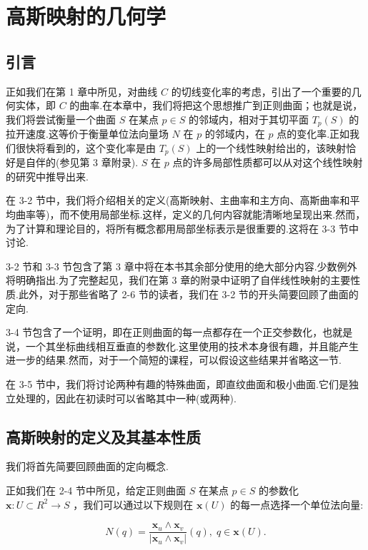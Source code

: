 \chapter{高斯映射的几何学}

\section{引言}

正如我们在第 1 章中所见，对曲线 \(C\) 的切线变化率的考虑，引出了一个重要的几何实体，即 \(C\) 的曲率.在本章中，我们将把这个思想推广到正则曲面；也就是说，我们将尝试衡量一个曲面 \(S\) 在某点 \(p \in  S\) 的邻域内，相对于其切平面 \({T}_{p}\left( S\right)\) 的拉开速度.这等价于衡量单位法向量场 \(N\) 在 \(p\) 的邻域内，在 \(p\) 点的变化率.正如我们很快将看到的，这个变化率是由 \({T}_{p}\left( S\right)\) 上的一个线性映射给出的，该映射恰好是自伴的(参见第 3 章附录). \(S\) 在 \(p\) 点的许多局部性质都可以从对这个线性映射的研究中推导出来.

在 3-2 节中，我们将介绍相关的定义(高斯映射、主曲率和主方向、高斯曲率和平均曲率等)，而不使用局部坐标.这样，定义的几何内容就能清晰地呈现出来.然而，为了计算和理论目的，将所有概念都用局部坐标表示是很重要的.这将在 3-3 节中讨论.

3-2 节和 3-3 节包含了第 3 章中将在本书其余部分使用的绝大部分内容.少数例外将明确指出.为了完整起见，我们在第 3 章的附录中证明了自伴线性映射的主要性质.此外，对于那些省略了 2-6 节的读者，我们在 3-2 节的开头简要回顾了曲面的定向.

3-4 节包含了一个证明，即在正则曲面的每一点都存在一个正交参数化，也就是说，一个其坐标曲线相互垂直的参数化.这里使用的技术本身很有趣，并且能产生进一步的结果.然而，对于一个简短的课程，可以假设这些结果并省略这一节.

在 3-5 节中，我们将讨论两种有趣的特殊曲面，即直纹曲面和极小曲面.它们是独立处理的，因此在初读时可以省略其中一种(或两种).

\section{高斯映射的定义及其基本性质}

我们将首先简要回顾曲面的定向概念.

正如我们在 2-4 节中所见，给定正则曲面 \(S\) 在某点 \(p \in  S\) 的参数化 \(\mathbf{x} : U \subset  {R}^{2} \rightarrow  S\) ，我们可以通过以下规则在 \(\mathbf{x}\left( U\right)\) 的每一点选择一个单位法向量:

\[
N\left( q\right)  = \frac{{\mathbf{x}}_{u} \land  {\mathbf{x}}_{v}}{\left| {\mathbf{x}}_{u} \land  {\mathbf{x}}_{v}\right| }\left( q\right) ,\;q \in  \mathbf{x}\left( U\right) .
\]

